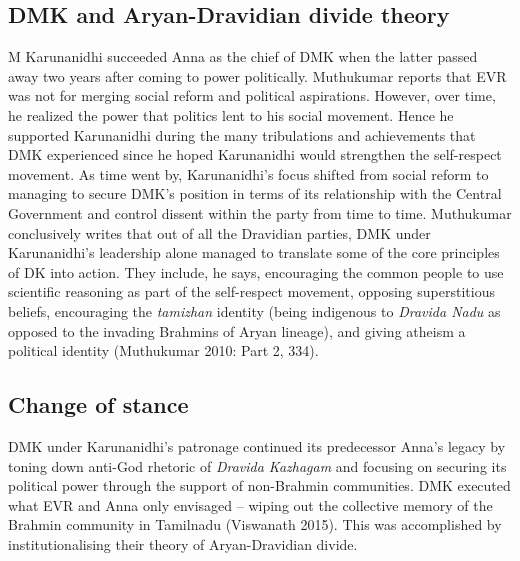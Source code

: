\subsection*{DMK and Aryan-Dravidian divide theory}

M Karunanidhi succeeded Anna as the chief of DMK when the latter passed away two years after coming to power politically. Muthukumar reports that EVR was not for merging social reform and political aspirations. However, over time, he realized the power that politics lent to his social movement. Hence he supported Karunanidhi during the many tribulations and achievements that DMK experienced since he hoped Karunanidhi would strengthen the self-respect movement. As time went by, Karunanidhi’s focus shifted from social reform to managing to secure DMK’s position in terms of its relationship with the Central Government and control dissent within the party from time to time. Muthukumar conclusively writes that out of all the Dravidian parties, DMK under Karunanidhi’s leadership alone managed to translate some of the core principles of DK into action. They include, he says, encouraging the common people to use scientific reasoning as part of the self-respect movement, opposing superstitious beliefs, encouraging the \textit{tamizhan} identity (being indigenous to \textit{Dravida Nadu} as opposed to the invading Brahmins of Aryan lineage), and giving atheism a political identity (Muthukumar 2010: Part 2, 334).

\newpage


\subsection*{Change of stance}

DMK under Karunanidhi’s patronage continued its predecessor Anna’s legacy by toning down anti-God rhetoric of \textit{Dravida Kazhagam} and focusing on securing its political power through the support of non-Brahmin communities. DMK executed what EVR and Anna only envisaged – wiping out the collective memory of the Brahmin community in Tamilnadu (Viswanath 2015). This was accomplished by institutionalising their theory of Aryan-Dravidian divide.

